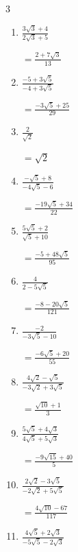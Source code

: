 \begin{multicols}{3}
\begin{enumerate}
        $\displaystyle =\frac{-5\sqrt{15}+9}{49}$

  \item $\displaystyle \frac{3\sqrt{3}+4}{2\sqrt{3}+5}$

        $\displaystyle =\frac{2+7\sqrt{3}}{13}$

  \item $\displaystyle \frac{-5+3\sqrt{5}}{-4+3\sqrt{5}}$

        $\displaystyle =\frac{-3\sqrt{5}+25}{29}$

  \item $\displaystyle \frac{2}{\sqrt{2}}$

        $\displaystyle =\sqrt{2}$

  \item $\displaystyle \frac{-\sqrt{5}+8}{-4\sqrt{5}-6}$

        $\displaystyle =\frac{-19\sqrt{5}+34}{22}$

\columnbreak %

  \item $\displaystyle \frac{5\sqrt{5}+2}{\sqrt{5}+10}$

        $\displaystyle =\frac{-5+48\sqrt{5}}{95}$

  \item $\displaystyle \frac{4}{2-5\sqrt{5}}$

        $\displaystyle =\frac{-8-20\sqrt{5}}{121}$

  \item $\displaystyle \frac{-2}{-3\sqrt{5}-10}$

        $\displaystyle =\frac{-6\sqrt{5}+20}{55}$

  \item $\displaystyle \frac{4\sqrt{2}-\sqrt{5}}{-3\sqrt{2}+3\sqrt{5}}$

        $\displaystyle =\frac{\sqrt{10}+1}{3}$

  \item $\displaystyle \frac{5\sqrt{5}+4\sqrt{3}}{4\sqrt{5}+5\sqrt{3}}$

        $\displaystyle =\frac{-9\sqrt{15}+40}{5}$

\columnbreak %

\resetques

  \item $\displaystyle \frac{2\sqrt{2}-3\sqrt{5}}{-2\sqrt{2}+5\sqrt{5}}$

        $\displaystyle =\frac{4\sqrt{10}-67}{117}$

  \item $\displaystyle \frac{4\sqrt{5}+2\sqrt{3}}{-5\sqrt{5}-2\sqrt{3}}$


\end{enumerate}
\end{multicols}
